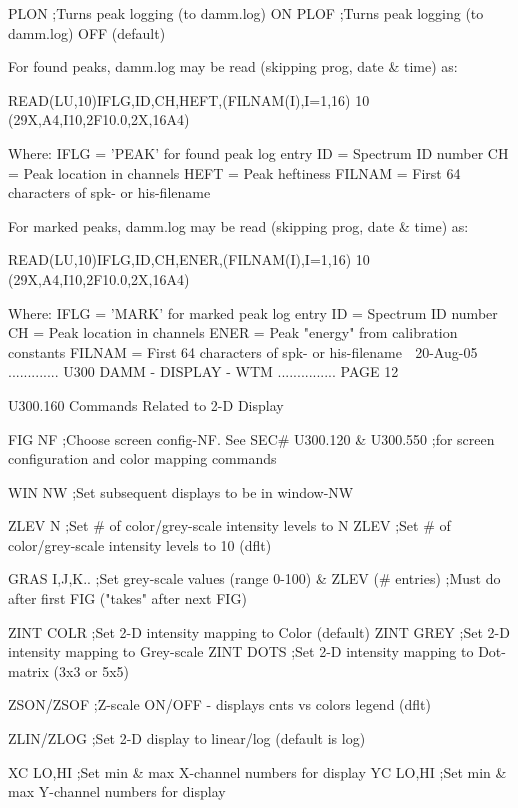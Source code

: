    PLON           ;Turns peak logging (to damm.log) ON
   PLOF           ;Turns peak logging (to damm.log) OFF (default)
 
   For found peaks, damm.log may be read (skipping prog, date & time) as:
 
          READ(LU,10)IFLG,ID,CH,HEFT,(FILNAM(I),I=1,16)
       10 (29X,A4,I10,2F10.0,2X,16A4)
 
   Where: IFLG   = 'PEAK' for found peak log entry
          ID     = Spectrum ID number
          CH     = Peak location in channels
          HEFT   = Peak heftiness
          FILNAM = First 64 characters of spk- or his-filename
 
   For marked peaks, damm.log may be read (skipping prog, date & time) as:
 
          READ(LU,10)IFLG,ID,CH,ENER,(FILNAM(I),I=1,16)
       10 (29X,A4,I10,2F10.0,2X,16A4)
 
   Where: IFLG   = 'MARK' for marked peak log entry
          ID     = Spectrum ID number
          CH     = Peak location in channels
          ENER   = Peak "energy" from calibration constants
          FILNAM = First 64 characters of spk- or his-filename
    
   20-Aug-05 ............. U300  DAMM - DISPLAY - WTM ............... PAGE  12
 
   U300.160  Commands Related to 2-D Display
 
   FIG   NF       ;Choose screen config-NF. See SEC# U300.120 & U300.550
                  ;for screen configuration and color mapping commands
 
   WIN   NW       ;Set subsequent displays to be in window-NW
 
   ZLEV  N        ;Set # of color/grey-scale intensity levels to N
   ZLEV           ;Set # of color/grey-scale intensity levels to 10 (dflt)
 
   GRAS  I,J,K..  ;Set grey-scale values (range 0-100) & ZLEV (# entries)
                  ;Must do after first FIG  ("takes" after next FIG)
 
   ZINT  COLR     ;Set 2-D intensity mapping to Color (default)
   ZINT  GREY     ;Set 2-D intensity mapping to Grey-scale
   ZINT  DOTS     ;Set 2-D intensity mapping to Dot-matrix (3x3 or 5x5)
 
   ZSON/ZSOF      ;Z-scale ON/OFF - displays cnts vs colors legend (dflt)
 
   ZLIN/ZLOG      ;Set 2-D display to linear/log (default is log)
 
   XC    LO,HI    ;Set min & max X-channel numbers for display
   YC    LO,HI    ;Set min & max Y-channel numbers for display
 
